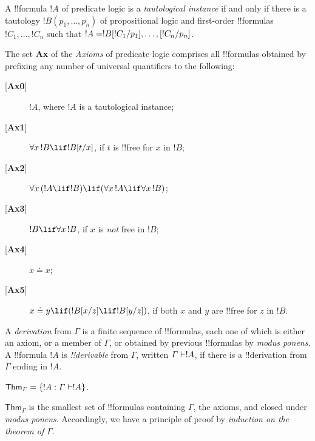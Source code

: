 \documentclass[../../include/open-logic-section]{subfiles}
\begin{document}


\begin{defn}
  A !!{formula} $!A$ of predicate logic is a \emph{tautological
    instance} if and only if there is a tautology $!B(p_1,\ldots,p_n)$ of
  propositional logic and first-order !!{formula}s
  $!C_1,\ldots,!C_n$ such that $!A =
  !B[!C_1/p_1],\ldots,[!C_n/p_n]$. 
\end{defn}

\begin{defn}[Axioms]
  The set \textbf{Ax} of the \emph{Axioms} of predicate logic
  comprises all !!{formula}s obtained by prefixing any number of universal
  quantifiers to the following:
  \begin{description}
  \item[{[\textbf{Ax0}]}] $!A$, where $!A$ is a tautological
    instance;
  \item[{[\textbf{Ax1}]}] $\lforall[x][!B] \lif \Subst{!B}{t}{x}$,
    if $t$ is !!{free for} $x$ in $!B$;
  \item[{[\textbf{Ax2}]}] $\lforall[x][(!A \lif !B)] \lif
    (\lforall[x][!A] \lif \lforall[x][!B])$;
  \item[{[\textbf{Ax3}]}] $!B \lif \lforall[x][!B]$, if $x$ is
    \emph{not} free in $!B$;
  \item[{[\textbf{Ax4}]}] $x \doteq x$;
  \item[{[\textbf{Ax5}]}] $x \doteq y \lif (\Subst{!B}{x}{z}
    \lif \Subst{!B}{y}{z})$, if both $x$ and $y$ are !!{free for}
    $z$ in $!B$.
  \end{description}
\end{defn}

\begin{defn}[Derivations]
A \emph{derivation} from $\Gamma$ is a finite sequence of !!{formula}s,
each
  one of which is either an axiom, or a member of $\Gamma$, or
  obtained by previous !!{formula}s by \emph{modus ponens}. A !!{formula}
  $!A$ is \emph{{!!derivable}} from $\Gamma$, written $\Gamma \Proves
  !A$, if there is a !!{derivation} from $\Gamma$ ending in $!A$. 
\end{defn}

\begin{defn}
  $\mathsf{Thm}_\Gamma = \{ !A :  \Gamma \Proves !A\}$. 
\end{defn}

\begin{prop}
 $\mathsf{Thm}_\Gamma$ is the smallest set of !!{formula}s containing
 $\Gamma$, the axioms, and closed under \emph{modus
   ponens}. Accordingly, we have a principle of proof by
 \emph{induction on the theorem of $\Gamma$}.  
\end{prop}
 
\end{document}
